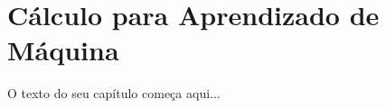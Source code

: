 
\chapter{Cálculo para Aprendizado de Máquina}
\label{cap:calculo-ia}

O texto do seu capítulo começa aqui...